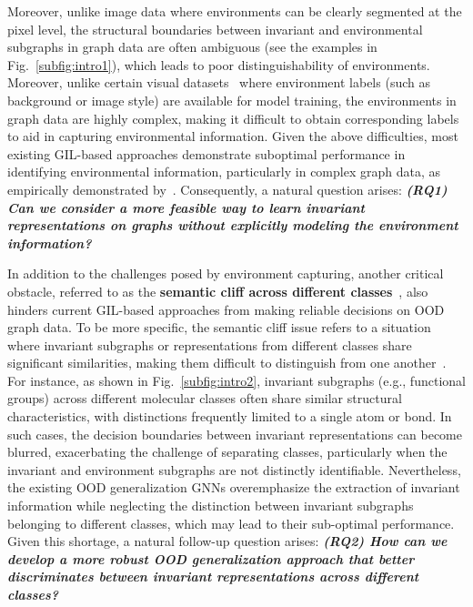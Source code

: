Moreover, unlike image data where environments can be clearly segmented at the pixel level, the structural boundaries between invariant and environmental subgraphs in graph data are often ambiguous (see the examples in Fig.~\ref{subfig:intro1}), which leads to poor distinguishability of environments. Moreover, unlike certain visual datasets~\citep{lin2022zin} where environment labels (such as background or image style) are available for model training, the environments in graph data are highly complex, making it difficult to obtain corresponding labels to aid in capturing environmental information. Given the above difficulties, most existing GIL-based approaches demonstrate suboptimal performance in identifying environmental information, particularly in complex graph data, as empirically demonstrated by~\citep{chen2024does}. Consequently, a natural question arises: \textbf{\textit{(RQ1) Can we consider a more feasible way to learn invariant representations on graphs without explicitly modeling the environment information?}}

In addition to the challenges posed by environment capturing, another critical obstacle, referred to as the \textbf{semantic cliff across different classes}~\citep{xia2024understanding}, also hinders current GIL-based approaches from making reliable decisions on OOD graph data. To be more specific, the semantic cliff issue refers to a situation where invariant subgraphs or representations from different classes share significant similarities, making them difficult to distinguish from one another~\citep{van2022exposing}.
For instance, as shown in Fig.~\ref{subfig:intro2}, invariant subgraphs (e.g., functional groups) across different molecular classes often share similar structural characteristics, with distinctions frequently limited to a single atom or bond. In such cases, the decision boundaries between invariant representations can become blurred, exacerbating the challenge of separating classes, particularly when the invariant and environment subgraphs are not distinctly identifiable. Nevertheless, the existing OOD generalization GNNs overemphasize the extraction of invariant information while neglecting the distinction between invariant subgraphs belonging to different classes, which may lead to their sub-optimal performance. Given this shortage, a natural follow-up question arises: \textbf{\textit{(RQ2) How can we develop a more robust OOD generalization approach that better discriminates between invariant representations across different classes?}}

